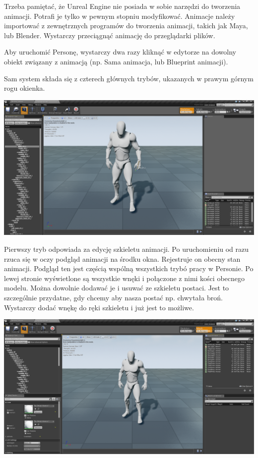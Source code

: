 \documentclass[brudnopis]{xmgr}
\begin{document}
Trzeba pamiętać, że Unreal Engine nie posiada w sobie narzędzi do tworzenia animacji. Potrafi je tylko w pewnym stopniu modyfikować. Animacje należy importować z zewnętrznych programów do tworzenia animacji, takich jak Maya, lub Blender. Wystarczy przeciągnąć animację do przeglądarki plików.

Aby uruchomić Personę, wystarczy dwa razy kliknąć w edytorze na dowolny obiekt związany z animacją (np. Sama animacja, lub Blueprint animacji).

Sam system składa się z czterech głównych trybów, ukazanych w prawym górnym rogu okienka.

\includegraphics[scale=0.25]{Screeny/Skeleton}

Pierwszy tryb odpowiada za edycję szkieletu animacji. Po uruchomieniu od razu rzuca się w oczy podgląd animacji na środku okna. Rejestruje on obecny stan animacji. Podgląd ten jest częścią wspólną wszystkich trybó pracy w Personie.
Po lewej stronie wyświetlone są wszystkie wnęki i połączone z nimi kości obecnego modelu. Można dowolnie dodawać je i usuwać ze szkieletu postaci. Jest to szczególnie przydatne, gdy chcemy aby nasza postać np. chwytała broń. Wystarczy dodać wnękę do ręki szkieletu i już jest to możliwe.

\includegraphics[scale=0.25]{Screeny/Mesh}
\end{document}
